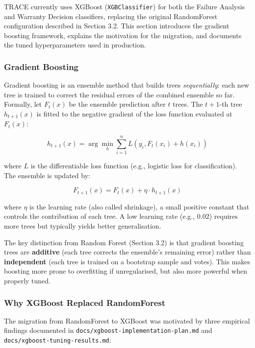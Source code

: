 \documentclass[10pt]{article}
\begin{document}
TRACE currently uses XGBoost (\texttt{XGBClassifier}) for both the Failure Analysis and Warranty Decision classifiers, replacing the original RandomForest configuration described in Section 3.2. This section introduces the gradient boosting framework, explains the motivation for the migration, and documents the tuned hyperparameters used in production.

\subsubsection{Gradient Boosting}

Gradient boosting is an ensemble method that builds trees \emph{sequentially}: each new tree is trained to correct the residual errors of the combined ensemble so far. Formally, let \(F_t(x)\) be the ensemble prediction after \(t\) trees. The \(t+1\)-th tree \(h_{t+1}(x)\) is fitted to the negative gradient of the loss function evaluated at \(F_t(x)\):

\begin{equation}
h_{t+1}(x) = \arg\min_{h} \sum_{i=1}^{n} L\left(y_i, F_t(x_i) + h(x_i)\right)
\end{equation}

where \(L\) is the differentiable loss function (e.g., logistic loss for classification). The ensemble is updated by:

\begin{equation}
F_{t+1}(x) = F_t(x) + \eta \cdot h_{t+1}(x)
\end{equation}

where \(\eta\) is the learning rate (also called shrinkage), a small positive constant that controls the contribution of each tree. A low learning rate (e.g., 0.02) requires more trees but typically yields better generalisation.

The key distinction from Random Forest (Section 3.2) is that gradient boosting trees are \textbf{additive} (each tree corrects the ensemble's remaining error) rather than \textbf{independent} (each tree is trained on a bootstrap sample and votes). This makes boosting more prone to overfitting if unregularised, but also more powerful when properly tuned.

\subsubsection{Why XGBoost Replaced RandomForest}

The migration from RandomForest to XGBoost was motivated by three empirical findings documented in \texttt{docs/xgboost-implementation-plan.md} and \texttt{docs/xgboost-tuning-results.md}:
\end{document}
